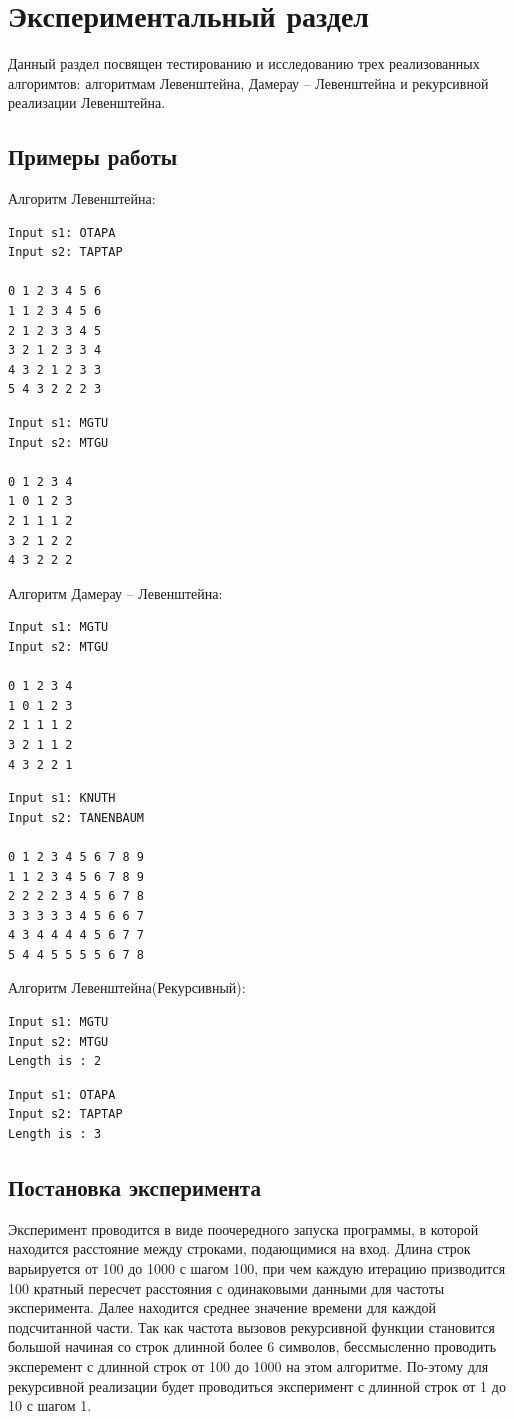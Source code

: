 \chapter{ Экспериментальный раздел}
Данный раздел посвящен тестированию и исследованию трех реализованных алгоримтов: алгоритмам Левенштейна, Дамерау -- Левенштейна и рекурсивной реализации Левенштейна.

\section{ Примеры работы}
Алгоритм Левенштейна:

\begin{lstlisting}
Input s1: OTAPA
Input s2: TAPTAP

0 1 2 3 4 5 6
1 1 2 3 4 5 6
2 1 2 3 3 4 5
3 2 1 2 3 3 4
4 3 2 1 2 3 3
5 4 3 2 2 2 3
\end{lstlisting}

\begin{lstlisting}
Input s1: MGTU
Input s2: MTGU

0 1 2 3 4
1 0 1 2 3
2 1 1 1 2
3 2 1 2 2
4 3 2 2 2
\end{lstlisting}

Алгоритм Дамерау -- Левенштейна:

\begin{lstlisting}
Input s1: MGTU
Input s2: MTGU

0 1 2 3 4
1 0 1 2 3
2 1 1 1 2
3 2 1 1 2
4 3 2 2 1
\end{lstlisting}

\begin{lstlisting}
Input s1: KNUTH
Input s2: TANENBAUM

0 1 2 3 4 5 6 7 8 9
1 1 2 3 4 5 6 7 8 9
2 2 2 2 3 4 5 6 7 8
3 3 3 3 3 4 5 6 6 7
4 3 4 4 4 4 5 6 7 7
5 4 4 5 5 5 5 6 7 8
\end{lstlisting}

Алгоритм Левенштейна(Рекурсивный):

\begin{lstlisting}
Input s1: MGTU
Input s2: MTGU
Length is : 2
\end{lstlisting}

\begin{lstlisting}
Input s1: OTAPA
Input s2: TAPTAP
Length is : 3
\end{lstlisting}

\section{ Постановка эксперимента}
Эксперимент проводится в виде поочередного запуска программы, в которой находится расстояние между строками, подающимися на вход. Длина строк варьируется от 100 до 1000 с шагом 100, при чем каждую итерацию призводится 100 кратный пересчет расстояния с одинаковыми данными для частоты эксперимента. Далее находится среднее значение времени для каждой подсчитанной части. Так как частота вызовов рекурсивной функции становится большой начиная со строк длинной более 6 символов, бессмысленно проводить эксперемент с длинной строк от 100 до 1000 на этом алгоритме. По-этому для рекурсивной реализации будет проводиться эксперимент с длинной строк от 1 до 10 с шагом 1. 

